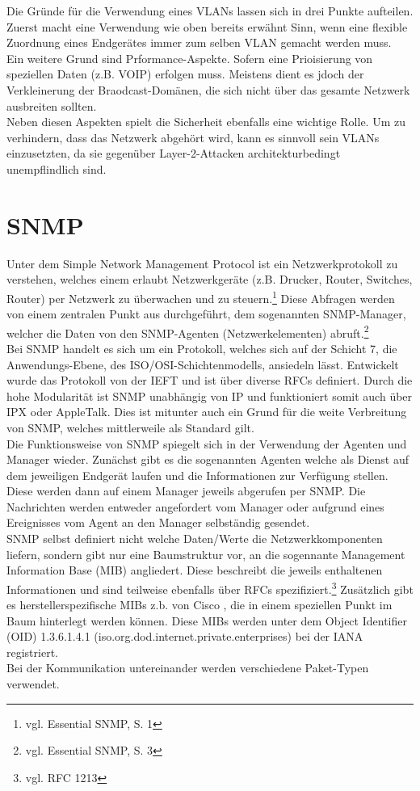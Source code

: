 Die Gründe für die Verwendung eines VLANs lassen sich in drei Punkte aufteilen.
Zuerst macht eine Verwendung wie oben bereits erwähnt Sinn, wenn eine flexible Zuordnung eines Endgerätes immer zum selben VLAN gemacht werden muss.\\
Ein weitere Grund sind Prformance-Aspekte. Sofern eine Prioisierung von speziellen Daten (z.B. VOIP) erfolgen muss. Meistens dient es jdoch der Verkleinerung der Braodcast-Domänen, die sich nicht über das gesamte Netzwerk ausbreiten sollten.\\
Neben diesen Aspekten spielt die Sicherheit ebenfalls eine wichtige Rolle. Um zu verhindern, dass das Netzwerk abgehört wird, kann es sinnvoll sein VLANs einzusetzten, da sie gegenüber Layer-2-Attacken architekturbedingt unempflindlich sind.


\section{SNMP}
\label{sec:snmp}
Unter dem Simple Network Management Protocol ist ein Netzwerkprotokoll zu verstehen, welches einem erlaubt Netzwerkgeräte (z.B. Drucker, Router, Switches, Router) per Netzwerk zu überwachen und zu steuern.\footnote{vgl. Essential SNMP, S. 1}
Diese Abfragen werden von einem zentralen Punkt aus durchgeführt, dem sogenannten SNMP-Manager, welcher die Daten von den SNMP-Agenten (Netzwerkelementen) abruft.\footnote{vgl. Essential SNMP, S. 3}\\
Bei SNMP handelt es sich um ein Protokoll, welches sich auf der Schicht 7, die Anwendungs-Ebene, des ISO/OSI-Schichtenmodells, ansiedeln lässt.
Entwickelt wurde das Protokoll von der IEFT und ist über diverse RFCs definiert.
Durch die hohe Modularität ist SNMP unabhängig von IP und funktioniert somit auch über IPX oder AppleTalk. Dies ist mitunter auch ein Grund für die weite Verbreitung von SNMP, welches mittlerweile als Standard gilt.\\
Die Funktionsweise von  SNMP spiegelt sich in der Verwendung der Agenten und Manager wieder.
Zunächst gibt es die sogenannten Agenten welche als Dienst auf dem jeweiligen Endgerät laufen und die Informationen zur Verfügung stellen. Diese werden dann auf einem Manager jeweils abgerufen per SNMP. Die Nachrichten werden entweder angefordert vom Manager oder aufgrund eines Ereignisses vom Agent an den Manager selbständig gesendet.\\
SNMP selbst definiert nicht welche Daten/Werte die Netzwerkkomponenten liefern, sondern gibt nur eine Baumstruktur vor, an die sogennante Management Information Base (MIB) angliedert.
Diese beschreibt die jeweils enthaltenen Informationen und sind teilweise ebenfalls über RFCs spezifiziert.\footnote{vgl. RFC 1213} Zusätzlich gibt es herstellerspezifische MIBs z.b. von Cisco , die in einem speziellen Punkt im Baum hinterlegt werden können. Diese MIBs werden unter dem  Object Identifier (OID) 1.3.6.1.4.1 (iso.org.dod.internet.private.enterprises) bei der IANA registriert.\\
Bei der Kommunikation untereinander werden verschiedene Paket-Typen verwendet.

